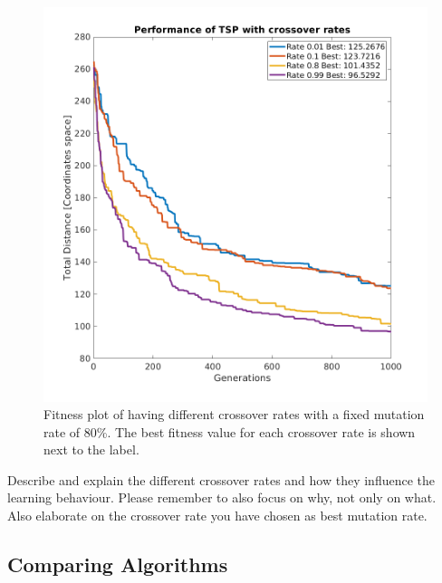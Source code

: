 \documentclass[a4paper, 12pt]{article}
\begin{document}
\begin{figure}[h!]
	\centering
	\includegraphics[width=1.0\textwidth]{images/CrossOverRatesVsMutationRate_80.png}
	\caption{Fitness plot of having different crossover rates with a fixed mutation rate of 80\%. The best fitness value for each crossover rate is shown next to the label. \label{fig:crossfig}}
\end{figure}

Describe and explain the different crossover rates and how they influence the learning behaviour. Please remember to also focus on why, not only on what.
Also elaborate on the crossover rate you have chosen as best mutation rate.
\newpage
\subsection{Comparing Algorithms}
\newpage
\end{document}
